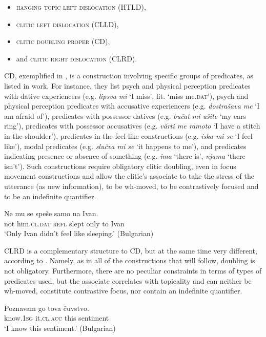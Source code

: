 \documentclass[output=paper,
colorlinks,
citecolor=brown,
newtxmath
]{langscibook}
\begin{document}
\begin{itemize}
\item \textsc{hanging topic left dislocation} (HTLD),
\item \textsc{clitic left dislocation} (CLLD),
\item \textsc{clitic doubling proper} (CD),
\item and \textsc{clitic right dislocation} (CLRD).
\end{itemize}

CD, exemplified in , is a construction involving specific groups of predicates, as listed in  work. For instance, they list psych and physical perception predicates with dative experiencers (e.g. \textit{lipsva mi} `I miss', lit. `miss me.\textsc{dat}'), psych and physical perception predicates with accusative experiencers (e.g. \textit{dostrašava me} `I am afraid of'), predicates with possessor datives (e.g. \textit{bučat mi ušite} `my ears ring'), predicates with possessor accusatives (e.g. \textit{vărti me ramoto} `I have a stitch in the shoulder'), predicates in the feel-like constructions (e.g. \textit{iska mi se} `I feel like'), modal predicates (e.g. \textit{slučva mi se} `it happens to me'), and predicates indicating presence or absence of something (e.g. \textit{ima} `there is', \textit{njama} `there isn’t'). Such constructions require obligatory clitic doubling, even in focus movement constructions and allow the clitic’s associate to take the stress of the utterance (as new information), to be wh-moved, to be contrastively focused and to be an indefinite quantifier.


\ea\label{ex:6}
\gll Ne  mu          se   speše samo na Ivan.\\
     not him.\textsc{cl.dat} \textsc{refl} slept only to Ivan \\
\glt `Only Ivan didn't feel like sleeping.'
\hfill (Bulgarian)
\z

\noindent CLRD is a complementary structure to CD, but at the same time very different, according to \citet{Cinque.Krapova2008}. Namely, as in all of the constructions that will follow, doubling is not obligatory. Furthermore, there are no peculiar constraints in terms of types of predicates used, but the associate correlates with topicality and can neither be wh-moved, constitute contrastive focus, nor contain an indefinite quantifier.


\ea\label{ex:7}
\gll Poznavam go         tova čuvstvo.\\
     know.\textsc{1sg} it.\textsc{cl.acc} this sentiment  \\
\glt `I know this sentiment.'
\hfill (Bulgarian)
\z
\end{document}
